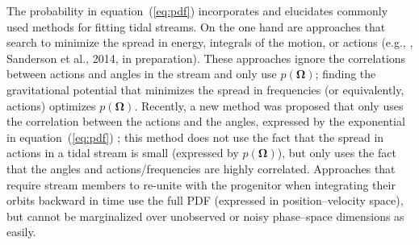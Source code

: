 \documentclass[12pt,preprint]{aastex}
\newcommand{\etal}{et al.}
\newcommand{\eg}{e.g.}
\newcommand{\eqnname}{equation}
\renewcommand{\vec}[1]{\ensuremath{\mathbf{#1}}}
\newcommand{\veco}{\ensuremath{\vec{\Omega}}}
\begin{document}
The probability in \eqnname~(\ref{eq:pdf}) incorporates and elucidates
commonly used methods for fitting tidal streams. On the one hand are
approaches that search to minimize the spread in energy, integrals of
the motion, or actions (\eg, \citealt{Binney08a,Penarrubia12a},
Sanderson \etal, 2014, in preparation). These approaches ignore the
correlations between actions and angles in the stream and only use
$p(\veco)$; finding the gravitational potential that minimizes the
spread in frequencies (or equivalently, actions) optimizes
$p(\veco)$. Recently, a new method was proposed that only uses the
correlation between the actions and the angles, expressed by the
exponential in \eqnname~(\ref{eq:pdf}) \citep{Sanders13b}; this method
does not use the fact that the spread in actions in a tidal stream is
small (expressed by $p(\veco)$), but only uses the fact that the
angles and actions/frequencies are highly correlated. Approaches that
require stream members to re-unite with the progenitor when
integrating their orbits backward in time
\citep{Johnston99a,PriceWhelan13a} use the full PDF (expressed in
position--velocity space), but cannot be marginalized over unobserved
or noisy phase--space dimensions as easily.
\end{document}
